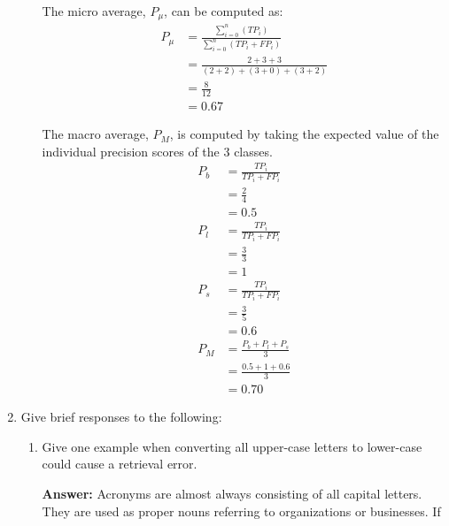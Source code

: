 \documentclass[11pt]{article}
\begin{document}
\begin{enumerate}
\begin{enumerate}
                The micro average, $P_{\mu}$, can be computed as:
                \begin{align*}
                  P_{\mu} & = \frac{\sum_{i=0}^{n}(TP_i)}{\sum_{i=0}^{n}(TP_i+FP_i)} \\
                          & = \frac{2+3+3}{(2+2)+(3+0)+(3+2)}                        \\
                          & = \frac{8}{12}                                           \\
                          & = 0.67
                \end{align*}

                The macro average, $P_{M}$, is computed by taking the expected value of the individual precision scores of the 3 classes.
                \begin{align*}
                  P_{b} & = \frac{TP_i}{TP_i+FP_i}      \\
                        & = \frac{2}{4}                 \\
                        & = 0.5                         \\
                  P_{l} & = \frac{TP_i}{TP_i+FP_i}      \\
                        & = \frac{3}{3}                 \\
                        & = 1                           \\
                  P_{s} & = \frac{TP_i}{TP_i+FP_i}      \\
                        & = \frac{3}{5}                 \\
                        & = 0.6                         \\
                  P_{M} & = \frac{P_{b}+P_{l}+P_{s}}{3} \\
                        & = \frac{0.5+1+0.6}{3}         \\
                        & = 0.70
                \end{align*}

        \end{enumerate}

  \item Give brief responses to the following:
        \begin{enumerate}
          \item Give one example when converting all upper-case letters to lower-case could cause a retrieval error.

                \textbf{Answer:} Acronyms are almost always consisting of all capital letters. They are used as proper nouns referring to organizations or businesses. If


\end{enumerate}
\end{enumerate}
\end{document}
